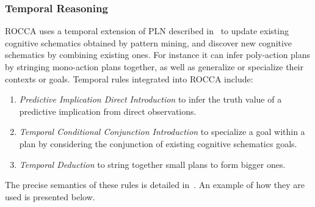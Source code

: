\documentclass[runningheads]{llncs}
\begin{document}
\subsubsection{Temporal Reasoning}
ROCCA uses a temporal extension of PLN described
in~\cite{Geisweiller2023TPLN} to update existing cognitive schematics
obtained by pattern mining, and discover new cognitive schematics by
combining existing ones.  For instance it can infer poly-action plans
by stringing mono-action plans together, as well as generalize or
specialize their contexts or goals.  Temporal rules integrated into
ROCCA include:
\begin{enumerate}
\item \emph{Predictive Implication Direct Introduction} to infer the
  truth value of a predictive implication from direct observations.
\item \emph{Temporal Conditional Conjunction Introduction} to
  specialize a goal within a plan by considering the conjunction of
  existing cognitive schematics goals.
\item \emph{Temporal Deduction} to string together small plans to form
  bigger ones.
\end{enumerate}
The precise semantics of these rules is detailed
in~\cite{Geisweiller2023TPLN}.  An example of how they are used is
presented below.
\end{document}
